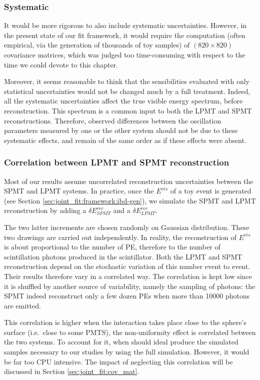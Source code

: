 \documentclass[../main.tex]{subfiles}
\begin{document}
\subsubsection{Systematic}
It would be more rigorous to also include systematic uncertainties. However, in the present state of our fit framework, it would require the computation (often empirical, via the generation of thousands of toy samples) of $(820 \times 820)$ covariance matrices, which was judged too time-consuming with respect to the time we could devote to this chapter.

Moreover, it seems reasonable to think that the sensibilities evaluated with only statistical uncertainties would not be changed much by a full treatment. Indeed, all the systematic uncertainties affect the true visible energy spectrum, before reconstruction. This spectrum is a common input to both the LPMT and SPMT reconstructions. Therefore, observed differences between the oscillation parameters measured by one or the other system should not be due to these systematic effects, and remain of the same order as if these effects were absent.

\subsubsection{Correlation between LPMT and SPMT reconstruction}

Most of our results assume uncorrelated reconstruction uncertainties between the SPMT and LPMT systems. In practice, once the $E^{vis}$ of a toy event is generated (see Section \ref{sec:joint_fit:framework:ibd-gen}), we simulate the SPMT and LPMT reconstruction by adding a $\delta E^{rec}_{SPMT}$ and a $\delta E^{rec}_{LPMT}$.

The two latter increments are chosen randomly on Gaussian distribution. These two drawings are carried out independently. In reality, the reconstruction of $E^{vis}$ is about proportional to the number of PE, therefore to the number of scintillation photons produced in the scintillator. Both the LPMT and SPMT reconstruction depend on the stochastic variation of this number event to event. Their results therefore vary in a correlated way. The correlation is kept low since it is shuffled by another source of variability, namely the sampling of photons: the SPMT indeed reconstruct only a few dozen PEs when more than 10000 photons are emitted.

This correlation is higher when the interaction takes place close to the sphere's surface (i.e.\ close to some PMTS), the non-uniformity effect is correlated between the two systems. To account for it, when should ideal produce the simulated samples necessary to our studies by using the full simulation. However, it would be far too CPU intensive. The impact of neglecting this correlation will be discussed in Section \ref{sec:joint_fit:cov_mat}.
\end{document}

